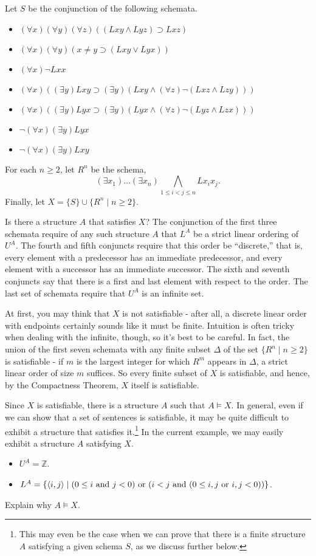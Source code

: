   Let $S$ be the conjunction of the following schemata.
\begin{itemize}
\item 
$(\forall x)(\forall y)(\forall z)((Lxy \wedge Lyz) \supset Lxz)$
\item
$(\forall x)(\forall y)(x\neq y\supset(Lxy \vee Lyx))$
\item
$(\forall x) \neg Lxx$
\item 
$(\forall x)((\exists y)Lxy\supset(\exists y)(Lxy\wedge (\forall z)\neg (Lxz\wedge Lzy)))$
\item 
$(\forall x)((\exists y)Lyx\supset(\exists y)(Lyx\wedge (\forall z)\neg (Lyz\wedge Lzx)))$
\item
$\neg(\forall x)(\exists y)Lyx$
\item
$\neg(\forall x)(\exists y)Lxy$
\end{itemize}
For each $n\geq 2$, let $R^n$ be the schema, 
\[
(\exists x_1)\ldots(\exists x_n)\bigwedge_{1\leq i< j\leq n}Lx_ix_j.
\]
Finally, let $X=\{S\}\cup\{R^n\mid n\geq 2\}$.

Is there a structure $A$ that satisfies $X$? The conjunction of the first three schemata require of any such structure $A$ that $L^A$ be a strict linear ordering of $U^A$. %
The fourth and fifth conjuncts require that this order be ``discrete,'' that is, every element with a predecessor has an immediate predecessor, and every element with a successor has an immediate successor. The sixth and seventh conjuncts say that there is a first and last element with respect to the order. The last set of schemata require that $U^A$ is an infinite set.%

At first, you may think that $X$ is not satisfiable - after all, a discrete linear order with endpoints certainly sounds like it must be finite. Intuition is often tricky when dealing with the infinite, though, so it's best to be careful. In fact, the union of the first seven schemata with any finite subset $\Delta$ of the set $\{R^n \mid n \geq 2\}$ is satisfiable - if $m$ is the largest integer for which $R^m$ appears in $\Delta$, a strict linear order of size $m$ suffices. So every finite subset of $X$ is satisfiable, and hence, by the Compactness Theorem, $X$ itself is satisfiable. 

Since $X$ is satisfiable, 
there is a structure $A$ such that $A\models X$. In general, even if we can show that a set of sentences is satisfiable, it may be quite difficult to exhibit a structure that satisfies it.\footnote{This may even be the case when we can prove that there is a finite structure $A$ satisfying a given schema $S$, as we discuss further below.}
In the current example, we may easily exhibit a structure $A$ satisfying $X$. 

\begin{itemize}
\item
$U^A=  \mathbb{Z}$.
\item
$L^A=\{\mbox{$\langle i,j \rangle$}\mid (0\leq i\mbox{ and } j<0)\mbox{ or }(i<j \mbox{ and }  (0\leq i,j\mbox{ or } i,j<0))\}$.
\end{itemize}

\begin{aside}
    Explain why $A \models X$. 
\end{aside}